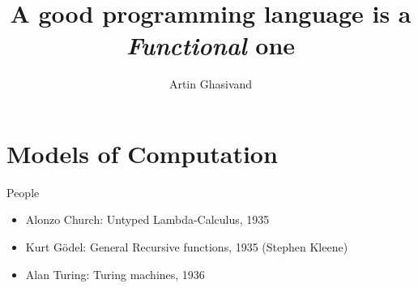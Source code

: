 \documentclass[pdf]{beamer}
\title{A good programming language is a \textit{Functional} one}
\author{Artin Ghasivand}
\begin{document}
\begin{frame}
  \titlepage
\end{frame}

\section{Models of Computation}
\label{sec:models-of-computation}

\begin{frame}{People}
  \begin{figure}[ht!]
    \centering
    \hspace{0.1cm}
    \hspace{0.1cm}
  \end{figure}
  \begin{itemize}
  \item Alonzo Church: Untyped Lambda-Calculus, 1935
  \item Kurt Gödel: General Recursive functions, 1935 (Stephen Kleene)
  \item Alan Turing: Turing machines, 1936
  \end{itemize}
\end{frame}
\end{document}
